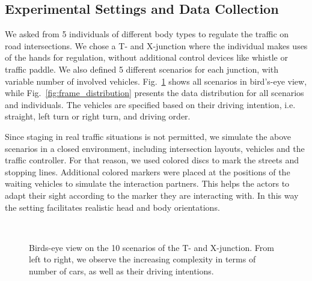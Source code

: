 \documentclass[letterpaper, 10 pt, conference]{ieeeconf}
\begin{document}
\subsection{Experimental Settings and Data Collection}

We asked from 5 individuals of different body types to regulate the traffic on road intersections. We chose a T- and X-junction where the individual makes uses of the hands for regulation, without additional control devices like whistle or traffic paddle. We also defined 5 different scenarios for each junction, with variable number of involved vehicles. Fig.~\ref{fig:scenarios} shows all scenarios in bird's-eye view, while Fig.~\ref{fig:frame_distribution} presents the data distribution for all scenarios and individuals. The vehicles are specified based on their driving intention, i.e. straight, left turn or right turn, and driving order.

Since staging in real traffic situations is not permitted, we simulate the above scenarios in a closed environment, including intersection layouts, vehicles and the traffic controller. For that reason, we used colored discs to mark the streets and stopping lines. Additional colored markers were placed at the positions of the waiting vehicles to simulate the interaction partners. This helps the actors to adapt their sight according to the marker they are interacting with. In this way the setting facilitates realistic head and body orientations.

\begin{figure}[t]
    \centering
    \\
    \caption{Birds-eye view on the 10 scenarios of the T- and X-junction. From left to right, we observe the increasing complexity in terms of number of cars, as well as their driving intentions.}
    \label{fig:scenarios}
\end{figure}
\end{document}
